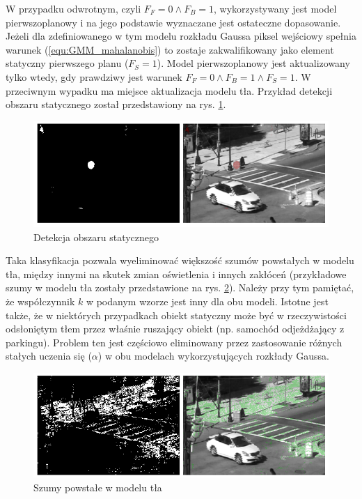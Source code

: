 \documentclass[10pt,a4paper]{article}
\begin{document}
W przypadku odwrotnym, czyli $F_F = 0 \land F_B = 1$, wykorzystywany jest model pierwszoplanowy i na jego podstawie wyznaczane jest ostateczne dopasowanie. Jeżeli dla zdefiniowanego w tym modelu rozkładu Gaussa piksel wejściowy spełnia warunek (\ref{equ:GMM_mahalanobis}) to zostaje zakwalifikowany jako element statyczny pierwszego planu ($F_S = 1$). Model pierwszoplanowy jest aktualizowany tylko wtedy, gdy prawdziwy jest warunek $F_F = 0 \land F_B = 1 \land F_S = 1$. W przeciwnym wypadku ma miejsce aktualizacja modelu tła. Przykład detekcji obszaru statycznego został przedstawiony na rys. \ref{fig:ftsg_static}.

		\begin{figure}[h]
				\centering
				\includegraphics[scale=0.65]{img/ftsg_static_obj.png}
				\caption{Detekcja obszaru statycznego}
				\label{fig:ftsg_static}
		\end{figure}

Taka klasyfikacja pozwala wyeliminować większość szumów powstałych w modelu tła, między innymi na skutek zmian oświetlenia i innych zakłóceń (przykładowe szumy w modelu tła zostały przedstawione na rys. \ref{fig:ftsg_illumination}). Należy przy tym pamiętać, że współczynnik $k$ w podanym wzorze jest inny dla obu modeli. Istotne jest także, że w niektórych przypadkach obiekt statyczny może być w rzeczywistości odsłoniętym tłem przez właśnie ruszający obiekt (np. samochód odjeżdżający z parkingu). Problem ten jest częściowo eliminowany przez zastosowanie różnych stałych uczenia się ($\alpha$) w obu modelach wykorzystujących rozkłady Gaussa.

	    \begin{figure}[h]
				\centering
				\includegraphics[scale=0.65]{img/ftsg_illumination.png}
				\caption{Szumy powstałe w modelu tła}
				\label{fig:ftsg_illumination}
		\end{figure}
\end{document}

